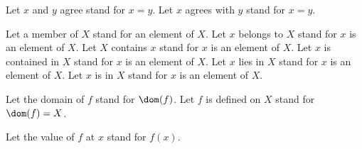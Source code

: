 


\begin{forthel}

  Let $x$ and $y$ agree stand for $x = y$.
  Let $x$ agrees with $y$ stand for $x = y$.


  Let a member of $X$ stand for an element of $X$.
  Let $x$ belongs to $X$ stand for $x$ is an element of $X$.
  Let $X$ contains $x$ stand for $x$ is an element of $X$.
  Let $x$ is contained in $X$ stand for $x$ is an element of $X$.
  Let $x$ lies in $X$ stand for $x$ is an element of $X$.
  Let $x$ is in $X$ stand for $x$ is an element of $X$.


  Let the domain of $f$ stand for $\dom(f)$.
  Let $f$ is defined on $X$ stand for $\dom(f) = X$.


  Let the value of $f$ at $x$ stand for $f(x)$.
\end{forthel}
